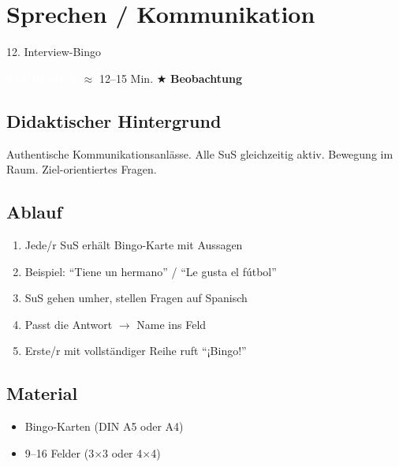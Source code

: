 \documentclass[11pt, a4paper]{article}
\newcommand{\tagSprechen}{\colorbox{sprechen}{\textcolor{white}{\footnotesize\textbf{SPRECHEN}}}}
\newcommand{\zeit}[1]{\textcolor{grau}{\footnotesize $\approx$ #1 Min.}}
\newcommand{\beobachtung}{\textcolor{erfolg}{\footnotesize $\bigstar$ \textbf{Beobachtung}}}
\begin{document}
\newpage


\section{Sprechen / Kommunikation}

\begin{methode}{12. Interview-Bingo}

\tagSprechen{} \zeit{12--15} \hfill \beobachtung

\subsection*{Didaktischer Hintergrund}
Authentische Kommunikationsanlässe. Alle SuS gleichzeitig aktiv. Bewegung im Raum. Ziel-orientiertes Fragen.

\subsection*{Ablauf}
\begin{enumerate}[leftmargin=*]
    \item Jede/r SuS erhält Bingo-Karte mit Aussagen
    \item Beispiel: ``Tiene un hermano'' / ``Le gusta el fútbol''
    \item SuS gehen umher, stellen Fragen auf Spanisch
    \item Passt die Antwort $\rightarrow$ Name ins Feld
    \item Erste/r mit vollständiger Reihe ruft ``¡Bingo!''
\end{enumerate}

\subsection*{Material}
\begin{materialbox}
\begin{itemize}[label=$\square$, leftmargin=*]
    \item Bingo-Karten (DIN A5 oder A4)
    \item 9--16 Felder (3$\times$3 oder 4$\times$4)
\end{itemize}


\end{materialbox}
\end{methode}
\end{document}
